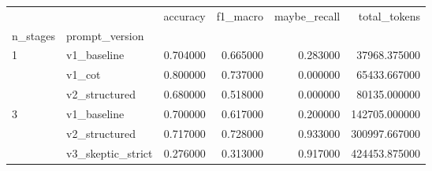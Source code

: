 \begin{tabular}{llrrrr}
\toprule
 &  & accuracy & f1_macro & maybe_recall & total_tokens \\
n_stages & prompt_version &  &  &  &  \\
\midrule
\multirow[t]{3}{*}{1} & v1_baseline & 0.704000 & 0.665000 & 0.283000 & 37968.375000 \\
 & v1_cot & 0.800000 & 0.737000 & 0.000000 & 65433.667000 \\
 & v2_structured & 0.680000 & 0.518000 & 0.000000 & 80135.000000 \\
\cline{1-6}
\multirow[t]{3}{*}{3} & v1_baseline & 0.700000 & 0.617000 & 0.200000 & 142705.000000 \\
 & v2_structured & 0.717000 & 0.728000 & 0.933000 & 300997.667000 \\
 & v3_skeptic_strict & 0.276000 & 0.313000 & 0.917000 & 424453.875000 \\
\cline{1-6}
\bottomrule
\end{tabular}
